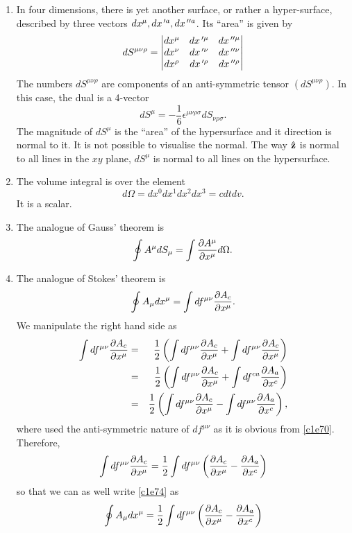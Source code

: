 \begin{enumerate}
\begin{enumerate}
\item In four dimensions, there is yet another surface, or rather a 
hyper-surface, described by three vectors $dx^\mu, dx^{{\,\prime} a}, dx^{{\,\prime\prime} a}$. Its 
``area'' is given by
\begin{equation}\label{c1e71}
dS^{\mu\nu\rho} = \begin{vmatrix}
dx^\mu & dx^{{\,\prime} \mu} & dx^{{\,\prime\prime} \mu} \\
dx^\nu & dx^{{\,\prime} \nu} & dx^{{\,\prime\prime} \nu} \\
dx^\rho & dx^{{\,\prime} \rho} & dx^{{\,\prime\prime} \rho}
\end{vmatrix}
\end{equation}
The numbers $dS^{\mu\nu\rho}$ are components of an anti-symmetric tensor 
$(dS^{\mu\nu\rho})$. In this case, the dual is a 4-vector
\begin{equation}\label{c1e72}
dS^\mu = -\frac{1}{6}\epsilon^{\mu\nu\rho\sigma}dS_{\nu\rho\sigma}.
\end{equation}
The magnitude of $dS^\mu$ is the ``area'' of the hypersurface and it direction
is normal to it. It is not possible to visualise the normal. The way $\hat{\mathbf{z}}$ is
normal to all lines in the $xy$ plane, $dS^\mu$ is normal to all lines on the
hypersurface.

\item The volume integral is over the element
\begin{equation}\label{c1e73}
d\Omega = dx^0 dx^1 dx^2 dx^3 = cdtdv.
\end{equation}
It is a scalar.

\item The analogue of Gauss' theorem is
\begin{equation}\label{c1e74}
\oint A^\mu dS_\mu = \int \frac{\partial{A^\mu}}{\partial{x^\mu}}d\Omega.
\end{equation}

\item The analogue of Stokes' theorem is
\begin{equation}\label{c1e75}
\oint A_\mu dx^\mu = \int df^{\mu\nu}\frac{\partial{A_{c}}}{\partial{x^\mu}}.
\end{equation}
We manipulate the right hand side as
\begin{eqnarray*}
\int df^{\mu\nu}\frac{\partial{A_{c}}}{\partial{x^\mu}} &=& \frac{1}{2}\left(\int df^{\mu\nu}\frac{\partial{A_{c}}}{\partial{x^\mu}} +
\int df^{\mu\nu}\frac{\partial{A_{c}}}{\partial{x^\mu}}\right) \\
&=& \frac{1}{2}\left(\int df^{\mu\nu}\frac{\partial{A_{c}}}{\partial{x^\mu}} + 
    \int df^{c a}\frac{\partial{A_{a}}}{\partial{x^c}}\right) \\
&=& \frac{1}{2}\left(\int df^{\mu\nu}\frac{\partial{A_{c}}}{\partial{x^\mu}} - 
    \int df^{\mu\nu}\frac{\partial{A_{a}}}{\partial{x^c}}\right),
\end{eqnarray*}
where used the anti-symmetric nature of $df^{\mu\nu}$ as it is obvious from 
\eqref{c1e70}. Therefore,
\[
\int df^{\mu\nu}\frac{\partial{A_{c}}}{\partial{x^\mu}} = 
\frac{1}{2}\int df^{\mu\nu}\left(\frac{\partial{A_{c}}}{\partial{x^\mu}} - \frac{\partial{A_{a}}}{\partial{x^c}}\right)
\]
so that we can as well write \eqref{c1e74} as
\begin{equation}\label{c1e76}
\oint A_\mu dx^\mu = \frac{1}{2}\int df^{\mu\nu}
\left(\frac{\partial{A_{c}}}{\partial{x^\mu}} - \frac{\partial{A_{a}}}{\partial{x^c}}\right)
\end{equation}


\end{enumerate}
\end{enumerate}
